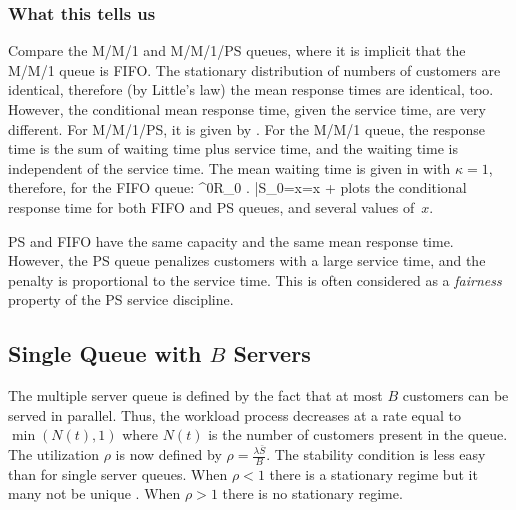 \subsubsection{What this tells us}
Compare the M/M/1 and M/M/1/PS queues, where it
is implicit that the M/M/1 queue is FIFO. The
stationary distribution of numbers of customers
are identical, therefore (by Little's law) the
mean response times are identical, too. However,
the conditional mean response time, given the
service time, are very different. For M/M/1/PS,
it is given by . For the M/M/1
queue, the response time is the sum of waiting
time plus service time, and the waiting time is
independent of the service time. The mean waiting
time is given in  with $\kappa=1$,
therefore, for the FIFO queue:
 \be
 \E^0\lp R_0 \right. \left|S_0=x\rp=x +
 \label{eq-fifo-crt}
\ee {} plots the conditional
response time for both FIFO and PS queues, and
several values of~$x$.

PS and FIFO have the same capacity and the same
mean response time. However, the PS queue
penalizes customers with a large service time,
and the penalty is proportional to the service
time. This is often considered as a
\emph{fairness} property of the PS service
discipline.
\begin{figure}[htbp]
\end{figure}


\subsection{Single Queue with $B$ Servers}
The multiple server queue is defined by the
fact that at most $B$ customers can be served in parallel.
Thus, the workload process decreases at a rate equal to
$\min(N(t),1)$ where $N(t)$ is the number of customers present
in the queue. The utilization $\rho$ is now defined by
$\rho=\frac{\lambda \bar{S}}{B}$. The stability condition is
less easy than for single server queues. When $\rho <1$ there
is a stationary regime but it many not be unique
\cite[2.3]{baccelli2003elements}. When $\rho>1$ there is no
stationary regime.
